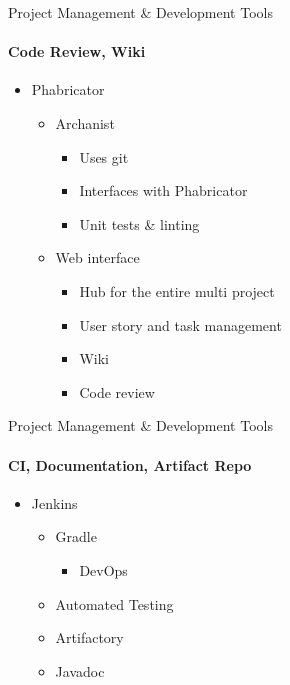     \begin{frame}[t]{Project Management \& Development Tools}\framesubtitle{Code Review, Wiki}
        \begin{itemize}
        	\item Phabricator
        	\begin{itemize}
        		\item Archanist
                \begin{itemize}
                    \item Uses git
                    \item Interfaces with Phabricator
                    \item Unit tests \& linting
                \end{itemize}
        		\item Web interface
                \begin{itemize}
                    \item Hub for the entire multi project
                    \item User story and task management
                    \item Wiki
                    \item Code review
                \end{itemize}
        	\end{itemize}
        \end{itemize}
    \end{frame}
    \begin{frame}[t]{Project Management \& Development Tools}\framesubtitle{CI, Documentation, Artifact Repo}
        \begin{itemize}
        	\item Jenkins
        	\begin{itemize}
        		\item Gradle
                \begin{itemize}
                    \item DevOps
                \end{itemize}
                \item Automated Testing
        		\item Artifactory
                \item Javadoc
        	\end{itemize}
        \end{itemize}
    \end{frame}
